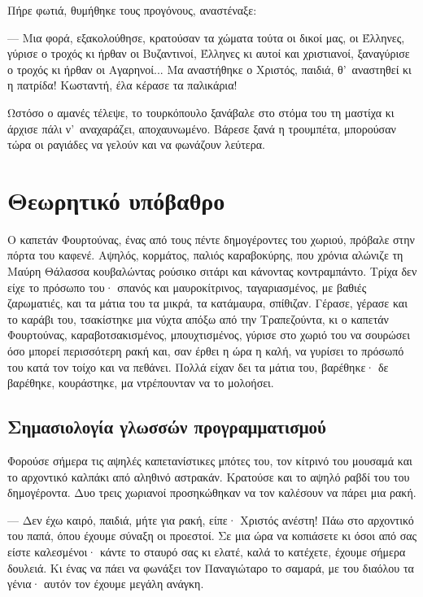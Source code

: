 \documentclass[diploma]{softlab-thesis}
\begin{document}
Πήρε φωτιά, θυμήθηκε τους προγόνους, αναστέναξε:

--- Μια φορά, εξακολούθησε, κρατούσαν τα χώματα τούτα οι δικοί μας, οι
Έλληνες, γύρισε ο τροχός κι ήρθαν οι Βυζαντινοί, Έλληνες κι αυτοί και
χριστιανοί, ξαναγύρισε ο τροχός κι ήρθαν οι Αγαρηνοί... Μα αναστήθηκε ο
Χριστός, παιδιά, θ’~αναστηθεί κι η πατρίδα! Κωσταντή, έλα κέρασε τα
παλικάρια!

Ωστόσο ο αμανές τέλεψε, το τουρκόπουλο ξανάβαλε στο στόμα του τη μαστίχα κι
άρχισε πάλι ν’~αναχαράζει, αποχαυνωμένο. Βάρεσε ξανά η τρουμπέτα, μπορούσαν
τώρα οι ραγιάδες να γελούν και να φωνάζουν λεύτερα.


\chapter{Θεωρητικό υπόβαθρο}

Ο καπετάν Φουρτούνας, ένας από τους πέντε δημογέροντες του χωριού, πρόβαλε
στην πόρτα του καφενέ. Αψηλός, κορμάτος, παλιός καραβοκύρης, που χρόνια
αλώνιζε τη Μαύρη Θάλασσα κουβαλώντας ρούσικο σιτάρι και κάνοντας
κοντραμπάντο. Τρίχα δεν είχε το πρόσωπο του· σπανός και μαυροκίτρινος,
ταγαριασμένος, με βαθιές ζαρωματιές, και τα μάτια του τα μικρά, τα
κατάμαυρα, σπίθιζαν. Γέρασε, γέρασε και το καράβι του, τσακίστηκε μια νύχτα
απόξω από την Τραπεζούντα, κι ο καπετάν Φουρτούνας, καραβοτσακισμένος,
μπουχτισμένος, γύρισε στο χωριό του να σουρώσει όσο μπορεί περισσότερη ρακή
και, σαν έρθει η ώρα η καλή, να γυρίσει το πρόσωπό του κατά τον τοίχο και να
πεθάνει. Πολλά είχαν δει τα μάτια του, βαρέθηκε· δε βαρέθηκε, κουράστηκε, μα
ντρέπουνταν να το μολοήσει.


\section{Σημασιολογία γλωσσών προγραμματισμού}

Φορούσε σήμερα τις αψηλές καπετανίστικες μπότες του, τον κίτρινό του μουσαμά
και το αρχοντικό καλπάκι από αληθινό αστρακάν. Κρατούσε και το αψηλό ραβδί
του του δημογέροντα. Δυο τρεις χωριανοί προσηκώθηκαν να τον καλέσουν να
πάρει μια ρακή.

--- Δεν έχω καιρό, παιδιά, μήτε για ρακή, είπε· Χριστός ανέστη! Πάω στο
αρχοντικό του παπά, όπου έχουμε σύναξη οι προεστοί. Σε μια ώρα να κοπιάσετε
κι όσοι από σας είστε καλεσμένοι· κάντε το σταυρό σας κι ελατέ, καλά το
κατέχετε, έχουμε σήμερα δουλειά. Κι ένας να πάει να φωνάξει τον Παναγιώταρο
το σαμαρά, με του διαόλου τα γένια· αυτόν τον έχουμε μεγάλη ανάγκη.
\end{document}
